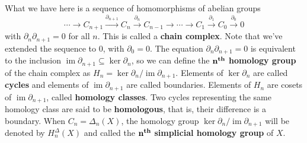 What we have here is a sequence of homomorphisms of abelian groups \[
    \cdots \to C_{n+1}\overset{\partial _{n+1}}{\longrightarrow} C_n \overset{\partial _n }{\longrightarrow} C_{n-1}\to \cdots \to C_1\overset{\partial_1}{\longrightarrow}C_0\overset{\partial_0}{\longrightarrow}0 
\] with $\partial _n \partial _{n+1}=0$ for all $n$. This is called a \textbf{chain complex}. Note that  we've extended the sequence to $0$, with $\partial_0=0 $. The equation $\partial _n \partial _{n+1}=0$ is equivalent to the inclusion $\operatorname{im}\partial _{n+1}\subseteq \ker \partial _n $, so we can define the $\mathbf{n}^{\text{\textbf{th}}}$ \textbf{homology group} of the chain complex as $H_n =\ker \partial_n  / \operatorname{im} \partial _{n+1}$. Elements of $\ker \partial _n $ are called \textbf{cycles} and elements of $\operatorname{im}\partial _{n+1}$ are called boundaries. Elements of $H_n $ are cosets of $\operatorname{im}\partial _{n+1}$, called \textbf{homology classes}. Two cycles representing the same homology class are said to be \textbf{homologous}, that is, their difference is a boundary. When $C_n=\Delta _n (X)$, the homology group $\ker \partial _n / \operatorname{im}\partial _{n+1} $ will be denoted by $H_n ^{\Delta }(X)$ and called the $\mathbf{n}^{\text{\textbf{th}}}$ \textbf{simplicial homology group} of $X$.

